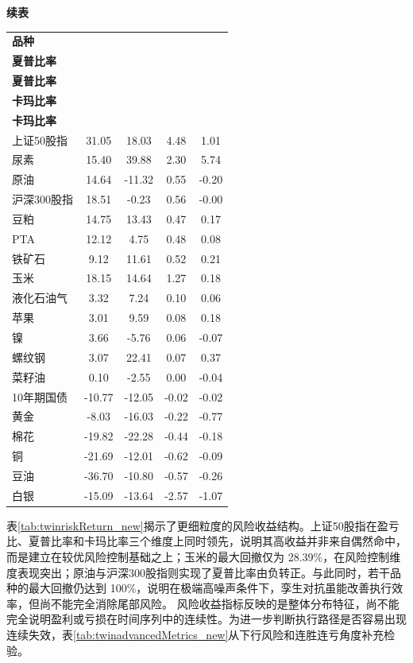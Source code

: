 \begin{table}[!htbp]
\centering
{\small\textbf{续表}}\\[0.5em]
\small
\setlength{\tabcolsep}{7pt}
\renewcommand{\arraystretch}{1.18}
\begin{tabular}{lcccc}
\toprule
\textbf{品种} & \makecell{\textbf{孪生对抗}\\\textbf{夏普比率}} & \makecell{\textbf{基准模型}\\\textbf{夏普比率}} & \makecell{\textbf{孪生对抗}\\\textbf{卡玛比率}} & \makecell{\textbf{基准模型}\\\textbf{卡玛比率}} \\
\midrule
上证50股指 & 31.05 & 18.03 & 4.48 & 1.01 \\
尿素 & 15.40 & 39.88 & 2.30 & 5.74 \\
原油 & 14.64 & -11.32 & 0.55 & -0.20 \\
沪深300股指 & 18.51 & -0.23 & 0.56 & -0.00 \\
豆粕 & 14.75 & 13.43 & 0.47 & 0.17 \\
PTA & 12.12 & 4.75 & 0.48 & 0.08 \\
铁矿石 & 9.12 & 11.61 & 0.52 & 0.21 \\
玉米 & 18.15 & 14.64 & 1.27 & 0.18 \\
液化石油气 & 3.32 & 7.24 & 0.10 & 0.06 \\
苹果 & 3.01 & 9.59 & 0.08 & 0.18 \\
镍 & 3.66 & -5.76 & 0.06 & -0.07 \\
螺纹钢 & 3.07 & 22.41 & 0.07 & 0.37 \\
菜籽油 & 0.10 & -2.55 & 0.00 & -0.04 \\
10年期国债 & -10.77 & -12.05 & -0.02 & -0.02 \\
黄金 & -8.03 & -16.03 & -0.22 & -0.77 \\
棉花 & -19.82 & -22.28 & -0.44 & -0.18 \\
铜 & -21.69 & -12.01 & -0.62 & -0.09 \\
豆油 & -36.70 & -10.80 & -0.57 & -0.26 \\
白银 & -15.09 & -13.64 & -2.57 & -1.07 \\
\bottomrule
\end{tabular}
\end{table}

表\ref{tab:twinriskReturn_new}揭示了更细粒度的风险收益结构。上证50股指在盈亏比、夏普比率和卡玛比率三个维度上同时领先，说明其高收益并非来自偶然命中，而是建立在较优风险控制基础之上；玉米的最大回撤仅为 28.39\%，在风险控制维度表现突出；原油与沪深300股指则实现了夏普比率由负转正。与此同时，若干品种的最大回撤仍达到 100\%，说明在极端高噪声条件下，孪生对抗虽能改善执行效率，但尚不能完全消除尾部风险。
风险收益指标反映的是整体分布特征，尚不能完全说明盈利或亏损在时间序列中的连续性。为进一步判断执行路径是否容易出现连续失效，表\ref{tab:twinadvancedMetrics_new}从下行风险和连胜连亏角度补充检验。

